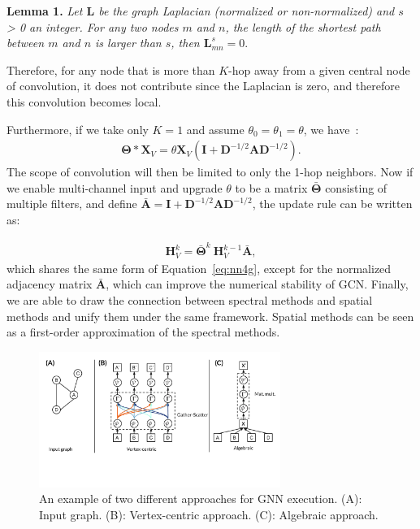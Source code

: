 \vspace{2mm}
\noindent \textbf{Lemma 1.} \textit{Let $\mathbf{L}$ be the graph Laplacian (normalized or non-normalized) and $s$ > 0 an integer. For any two nodes $m$ and $n$, the length of the shortest path between $m$ and $n$ is larger than $s$, then $\mathbf{L}^s_{mn} = 0$}.

Therefore, for any node that is more than $K$-hop away from a given central node of convolution, it does not contribute since the Laplacian is zero, and therefore this convolution becomes local.

Furthermore, if we take only $K=1$ and assume $\theta_0 = \theta_1 = \theta$, we have~\cite{gcn}:
\begin{gather}
\mathbf{\Theta} \ast \mathbf{X}_V =\theta \mathbf{X}_V (\mathbf{I} + \mathbf{D}^{-1/2}\mathbf{A}\mathbf{D}^{-1/2}).
\end{gather}
The scope of convolution will then be limited to only the 1-hop neighbors. Now if we enable multi-channel input and upgrade $\theta$ to be a matrix $\bar {\mathbf{\Theta}}$ consisting of multiple filters, and define $\bar {\mathbf{A}} = \mathbf{I} + \mathbf{D}^{-1/2}\mathbf{A}\mathbf{D}^{-1/2}$, the update rule can be written as:

\begin{gather}
\mathbf{H}_V^k = \bar {\mathbf{\Theta}}^k~\mathbf{H}_V^{k-1} \bar {\mathbf{A}},
\end{gather}
which shares the same form of Equation~\ref{eq:nn4g}, except for the normalized adjacency matrix $\bar {\mathbf{A}}$, which can improve the numerical stability of GCN. Finally, we are able to draw the connection between spectral methods and spatial methods and unify them under the same framework. Spatial methods can be seen as a first-order approximation of the spectral methods.
\begin{figure}[t]
 \centering
\includegraphics[width=0.70\textwidth]{./images/gnnsys.pdf}
 \caption{An example of two different approaches for GNN execution. (A): Input graph. (B): Vertex-centric approach. (C): Algebraic approach.}
 \label{fig:gnnsys}
\end{figure}

